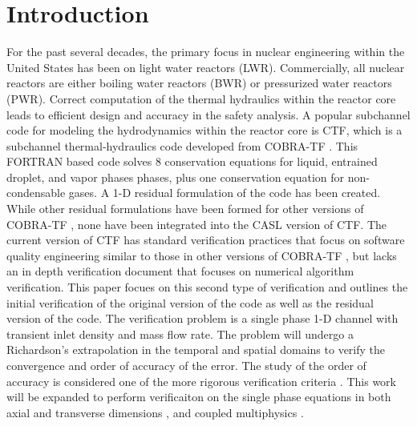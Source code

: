\vspace*{-80mm}
\chapter{Introduction} \label{chapter1:introduction}

For the past several decades, the primary focus in nuclear engineering within
the United States has been on light water reactors (LWR). Commercially,
all nuclear reactors are either boiling water reactors (BWR) or pressurized
water reactors (PWR). Correct computation of the thermal hydraulics within the
reactor core leads to efficient design and accuracy in the safety analysis. A
popular subchannel code for modeling the hydrodynamics within the reactor core
is CTF, which is a subchannel thermal-hydraulics code developed from
COBRA-TF \cite{Salko2014}. This FORTRAN based code solves 8 conservation
equations for liquid, entrained droplet, and vapor phases phases, plus one
conservation equation for non-condensable gases. A 1-D residual formulation of
the code has been created. While other residual formulations have been
formed for other versions of COBRA-TF \cite{Lloyd2014}, none have been
integrated into the CASL version of CTF. The current version of CTF has standard
verification practices that focus on software quality engineering similar to
those in other versions of COBRA-TF \cite{Aumiller2013}, but lacks an in
depth verification document that focuses on numerical algorithm verification.
This paper focues on this second type of verification and outlines the initial
verification of the original version of the code as well as the residual version
of the code. The verification problem is a single phase 1-D channel with
transient inlet density and mass flow rate. The problem will undergo a
Richardson's extrapolation in the temporal and spatial domains to verify the
convergence and order of accuracy of the error. The study of the order of
accuracy is considered one of the more rigorous verification criteria \cite{Roy2005}.
This work will be expanded to perform verificaiton on the single
phase equations in both axial and transverse dimensions \cite{Merroun2009}, and
coupled multiphysics \cite{Mahadevan2009}.












